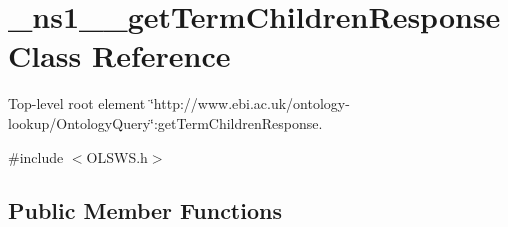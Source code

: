 \hypertarget{class__ns1____getTermChildrenResponse}{
\section{\_\-ns1\_\-\_\-getTermChildrenResponse Class Reference}
\label{class__ns1____getTermChildrenResponse}
}


Top-\/level root element \char`\"{}http://www.ebi.ac.uk/ontology-\/lookup/OntologyQuery\char`\"{}:getTermChildrenResponse.  




{\ttfamily \#include $<$OLSWS.h$>$}

\subsection*{Public Member Functions}
